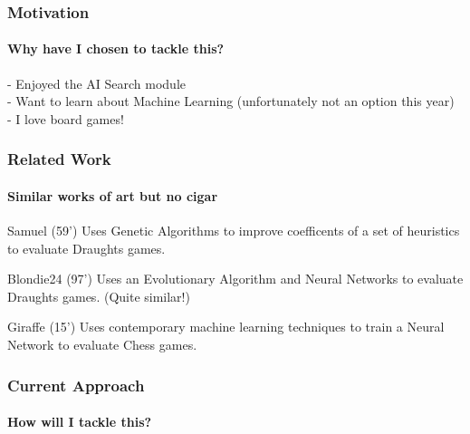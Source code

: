 \documentclass{beamer}
\begin{document}
\begin{frame}
	\frametitle{Motivation}
	\framesubtitle{Why have I chosen to tackle this?}

	- Enjoyed the AI Search module \\
	- Want to learn about Machine Learning (unfortunately not an option this year) \\
	- I love board games! \\

\end{frame}

\begin{frame}
	\frametitle{Related Work}
	\framesubtitle{Similar works of art but no cigar}
	\begin{block}{Samuel (59')}
		Uses Genetic Algorithms to improve coefficents of a set of heuristics to evaluate Draughts games.
	\end{block}
	\begin{block}{Blondie24 (97')}
		Uses an Evolutionary Algorithm and Neural Networks to evaluate Draughts games. (Quite similar!)
	\end{block}

	 \begin{block}{Giraffe (15')}
		Uses contemporary machine learning techniques to train a Neural Network to evaluate Chess games.
	 \end{block}
\end{frame}

\begin{frame}
	\frametitle{Current Approach}
	\framesubtitle{How will I tackle this?}
\end{frame}
\end{document}
